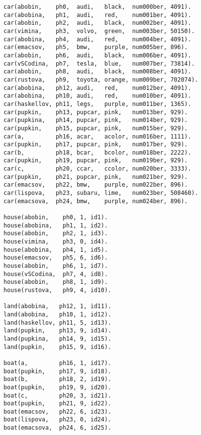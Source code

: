 \documentclass[a4paper,oneside,14pt]{extarticle}
\begin{document}
\begin{lstlisting}
  car(abobin,    ph0,  audi,   black,  num000ber, 4091).
  car(abobina,   ph1,  audi,   red,    num001ber, 4091).
  car(abobin,    ph2,  audi,   black,  num002ber, 4091).
  car(vimina,    ph3,  volvo,  green,  num003ber, 50150).
  car(abobina,   ph4,  audi,   red,    num004ber, 4091).
  car(emacsov,   ph5,  bmw,    purple, num005ber, 896).
  car(abobin,    ph6,  audi,   black,  num006ber, 4091).
  car(vSCodina,  ph7,  tesla,  blue,   num007ber, 73814).
  car(abobin,    ph8,  audi,   black,  num008ber, 4091).
  car(rustova,   ph9,  toyota, orange, num009ber, 702074).
  car(abobina,   ph12, audi,   red,    num012ber, 4091).
  car(abobina,   ph10, audi,   red,    num010ber, 4091).
  car(haskellov, ph11, legs,   purple, num011ber, 1365).
  car(pupkin,    ph13, pupcar, pink,   num013ber, 929).
  car(pupkina,   ph14, pupcar, pink,   num014ber, 929).
  car(pupkin,    ph15, pupcar, pink,   num015ber, 929).
  car(a,         ph16, acar,   acolor, num016ber, 1111).
  car(pupkin,    ph17, pupcar, pink,   num017ber, 929).
  car(b,         ph18, bcar,   bcolor, num018ber, 2222).
  car(pupkin,    ph19, pupcar, pink,   num019ber, 929).
  car(c,         ph20, ccar,   ccolor, num020ber, 3333).
  car(pupkin,    ph21, pupcar, pink,   num021ber, 929).
  car(emacsov,   ph22, bmw,    purple, num022ber, 896).
  car(lispova,   ph23, subaru, lime,   num023ber, 508460).
  car(emacsova,  ph24, bmw,    purple, num024ber, 896).

  house(abobin,    ph0, 1, id1).
  house(abobina,   ph1, 1, id2).
  house(abobin,    ph2, 1, id3).
  house(vimina,    ph3, 0, id4).
  house(abobina,   ph4, 1, id5).
  house(emacsov,   ph5, 6, id6).
  house(abobin,    ph6, 1, id7).
  house(vSCodina,  ph7, 4, id8).
  house(abobin,    ph8, 1, id9).
  house(rustova,   ph9, 4, id10).

  land(abobina,   ph12, 1, id11).
  land(abobina,   ph10, 1, id12).
  land(haskellov, ph11, 5, id13).
  land(pupkin,    ph13, 9, id14).
  land(pupkina,   ph14, 9, id15).
  land(pupkin,    ph15, 9, id16).

  boat(a,         ph16, 1, id17).
  boat(pupkin,    ph17, 9, id18).
  boat(b,         ph18, 2, id19).
  boat(pupkin,    ph19, 9, id20).
  boat(c,         ph20, 3, id21).
  boat(pupkin,    ph21, 9, id22).
  boat(emacsov,   ph22, 6, id23).
  boat(lispova,   ph23, 0, id24).
  boat(emacsova,  ph24, 6, id25).


\end{lstlisting}
\end{document}
